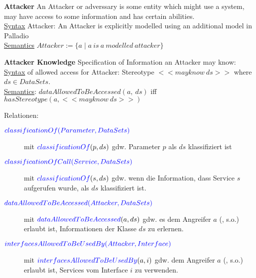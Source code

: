 \textbf{Attacker}
An Attacker or adverssary is some entity which might use a system, may have access to some information and has certain abilities.\\
\underline{Syntax} Attacker: An Attacker is explicitly modelled using an additional model in Palladio \\%
\underline{Semantics} $Attacker := \{ a \mid a~is~a~modelled~attacker\}$ %

\textbf{Attacker Knowledge}
Specification of Information an Attacker may know: \\
\underline{Syntax} of allowed access for Attacker: Stereotype $<<mayknow~ds>>$ where $ds \in DataSets$.\\
\underline{Semantics}: $dataAllowedToBeAccessed(a,~ds)$ iff $hasStereotype(a, <<mayknow~ds>>)$


Relationen:
\begin{description}
  \item[${\color{blue}{classificationOf(Parameter, DataSets)}}$]
        mit ${\color{blue}{classificationOf}}(p, ds)$ gdw. Parameter $p$ als $ds$ klassifiziert ist
  \item[${\color{blue}{classificationOfCall(Service, DataSets)}}$]
        mit ${\color{blue}{classificationOf}}(s, ds)$ gdw. wenn die Information, dass
        Service $s$ aufgerufen wurde, als $ds$ klassifiziert ist.
  \item[${\color{blue}{dataAllowedToBeAccessed(Attacker, DataSets)}}$]
        mit ${\color{blue}{dataAllowedToBeAccessed}}(a, ds)$ gdw. es dem Angreifer $a$ (, s.o.)
        erlaubt ist, Informationen der  Klasse $ds$ zu erlernen. \\

  \item[${\color{blue}{interfacesAllowedToBeUsedBy(Attacker, Interface)}}$]
        mit ${\color{blue}{interfacesAllowedToBeUsedBy}}(a, i)$ gdw. dem Angreifer $a$ (, s.o.) erlaubt ist, Services vom Interface $i$ zu verwenden.\\[0.5cm]


\end{description} 
